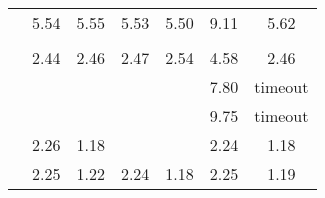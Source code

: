 \begin{table}[htb]
\begin{tabular}{|c|c|c|c|c|c|c |}
    \cite[Example 5]{plump2018modular} & 5.54
    &5.55
    & 5.53& 5.50& 9.11&  5.62  \\
    \cite[Example 6]{plump2018modular} &  &  & & &  &   \\
    \cite[Example 4]{bruggink2015proving} &
    2.44
    & 
    2.46
    & 
    2.47
    &
    2.54
    & 4.58 & 
    2.46
     \\
    \cite[Example 5]{bruggink2015proving} &  &  &&& 7.80& timeout  \\
    \cite[Example 6]{bruggink2015proving} &  &  &&& 9.75& timeout   \\
    \cite[Example 1]{bruggink2014termination} & 
     2.26
     &1.18
     & & &2.24
     & 1.18  
     \\
    \cite[Example 4]{bruggink2014termination} &  2.25
    & 1.22 & 2.24
    &1.18
    &2.25
    & 1.19 


\end{tabular}
\end{table}
